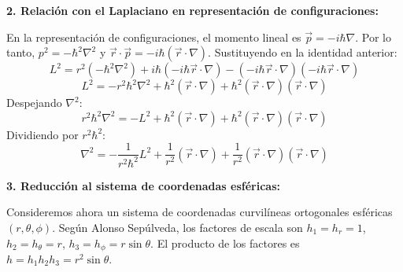 \documentclass[a4paper]{article}
\begin{document}
\textbf{2. Relación con el Laplaciano en representación de configuraciones:}

En la representación de configuraciones, el momento lineal es $\vec{p} = -i\hbar \nabla$. Por lo tanto, $p^2 = -\hbar^2 \nabla^2$ y $\vec{r} \cdot \vec{p} = -i\hbar (\vec{r} \cdot \nabla)$. Sustituyendo en la identidad anterior:
\begin{equation}
L^2 = r^2 (-\hbar^2 \nabla^2) + i\hbar (-i\hbar \vec{r} \cdot \nabla) - (-i\hbar \vec{r} \cdot \nabla) (-i\hbar \vec{r} \cdot \nabla)
\end{equation}
\begin{equation}
L^2 = -r^2 \hbar^2 \nabla^2 + \hbar^2 (\vec{r} \cdot \nabla) + \hbar^2 (\vec{r} \cdot \nabla) (\vec{r} \cdot \nabla)
\end{equation}
Despejando $\nabla^2$:
\begin{equation}
r^2 \hbar^2 \nabla^2 = -L^2 + \hbar^2 (\vec{r} \cdot \nabla) + \hbar^2 (\vec{r} \cdot \nabla) (\vec{r} \cdot \nabla)
\end{equation}
Dividiendo por $r^2 \hbar^2$:
\begin{equation}
\nabla^2 = - \frac{1}{r^2\hbar^2}L^2 + \frac{1}{r^2} (\vec{r} \cdot \nabla) + \frac{1}{r^2} (\vec{r} \cdot \nabla) (\vec{r} \cdot \nabla)
\end{equation}

\textbf{3. Reducción al sistema de coordenadas esféricas:}

Consideremos ahora un sistema de coordenadas curvilíneas ortogonales esféricas $(r, \theta, \phi)$. Según Alonso Sepúlveda, los factores de escala son $h_1 = h_r = 1$, $h_2 = h_\theta = r$, $h_3 = h_\phi = r \sin \theta$. El producto de los factores es $h = h_1 h_2 h_3 = r^2 \sin \theta$.
\end{document}

